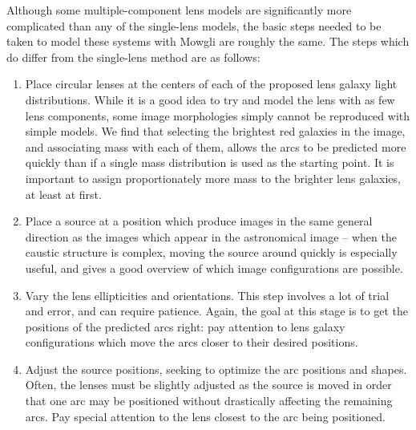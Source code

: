 \documentclass[iop]{emulateapj}
\def\theapplet{{\sc Mowgli}\xspace}
\begin{document}
Although some multiple-component lens models are significantly  more
complicated than any of the single-lens models, the basic steps needed to be
taken to model these systems with \theapplet are roughly the same.  The steps
which do differ from the single-lens method are as follows:

\begin{enumerate}
 \item Place circular lenses at the centers of each of 
 the proposed lens galaxy light distributions. While it is a good idea to try
 and model the lens with as few lens components, some image morphologies simply
 cannot be reproduced with simple models. We find that selecting the brightest
 red galaxies in the image, and associating mass with each of them, allows the
 arcs to be predicted more quickly than if a single mass distribution is
 used as the starting point. It is important to assign proportionately 
 more mass to the brighter lens galaxies, at least at first.
 \item Place a source at a position which produce images in the same general
 direction as the images which appear in the astronomical image -- when the
 caustic structure is complex, moving the source around quickly is especially
 useful, and gives a good
 overview of which image configurations are possible.
 \item Vary the lens ellipticities and orientations. This step involves
 a lot of trial and error, and can require patience. 
 Again, the goal at this stage 
 is to get the positions of the predicted arcs right:
 pay attention to lens galaxy
 configurations which move the arcs closer to their desired positions.
 \item Adjust the source positions, seeking to optimize the arc positions
 and shapes. Often, the lenses must be slightly adjusted as the source
 is moved in order that one arc may be positioned without drastically
 affecting the remaining arcs. Pay special attention to the lens closest
 to the arc being positioned.
\end{enumerate}
\end{document}
